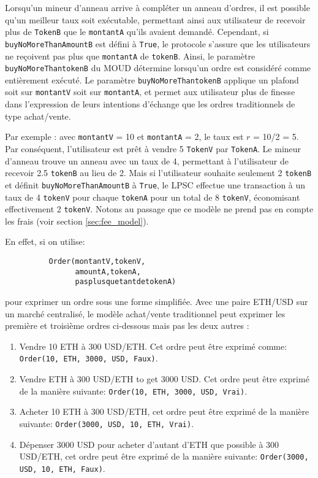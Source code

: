 \documentclass[UTF8,nofonts]{article}
\begin{document}
\begin{multicols}{2}
Lorsqu'un mineur d'anneau arrive à compléter un anneau d'ordres, il est possible qu'un meilleur taux soit exécutable, permettant ainsi aux utilisateur de recevoir plus de \verb|TokenB| que le \verb|montantA| qu'ils avaient demandé. Cependant, si \verb|buyNoMoreThanAmountB| est défini à \verb|True|, le protocole s'assure que les utilisateurs ne reçoivent pas plus que  \verb|montantA| de \verb|tokenB|. Ainsi, le paramètre \verb|buyNoMoreThantokenB| du MOUD détermine lorsqu'un ordre est considéré comme entièrement exécuté. Le paramètre \verb|buyNoMoreThantokenB| applique un plafond soit sur \verb|montantV| soit sur \verb|montantA|, et permet aux utilisateur plus de finesse dans l'expression de leurs intentions d'échange que les ordres traditionnels de type achat/vente.

Par exemple : avec \verb|montantV| = 10 et \verb|montantA| = 2, le taux est $r$ = 10/2 = 5. Par conséquent, l'utilisateur est prêt à vendre 5 \verb|TokenV| par \verb|TokenA|. Le mineur d'anneau trouve un anneau avec un taux de 4, permettant à l'utilisateur de recevoir 2.5 \verb|tokenB| au lieu de 2. Mais si l'utilisateur souhaite seulement 2 \verb|tokenB| et définit \verb|buyNoMoreThanAmountB| à \verb|True|, le LPSC effectue une transaction à un taux de 4 \verb|tokenV| pour chaque \verb|tokenA| pour un total de 8 \verb|tokenV|, économisant effectivement 2 \verb|tokenV|. Notons au passage que ce modèle ne prend pas en compte les frais (voir section \ref{sec:fee_model}).

En effet, si on utilise:


\begin{verbatim}
	      Order(montantV,tokenV,
	            amountA,tokenA,
	            pasplusquetantdetokenA)
\end{verbatim}

pour exprimer un ordre sous une forme simplifiée. Avec une paire ETH/USD sur un marché centralisé, le modèle achat/vente traditionnel peut exprimer les première et troisième ordres ci-dessous mais pas les deux autres : 

\begin{enumerate}
	\item Vendre 10 ETH à 300 USD/ETH. Cet ordre peut être exprimé comme: \verb|Order(10, ETH, 3000, USD, Faux)|.
	\item Vendre ETH à 300 USD/ETH to get 3000 USD. Cet ordre peut être exprimé de la manière suivante: \verb|Order(10, ETH, 3000, USD, Vrai)|.
	\item Acheter 10 ETH à 300 USD/ETH, cet ordre peut être exprimé de la manière suivante: \verb|Order(3000, USD, 10, ETH, Vrai)|.
	\item Dépenser 3000 USD pour acheter d'autant d'ETH que possible à 300 USD/ETH, cet ordre peut être exprimé de la manière suivante: \verb|Order(3000, USD, 10, ETH, Faux)|.
\end{enumerate}




\end{multicols}
\end{document}
